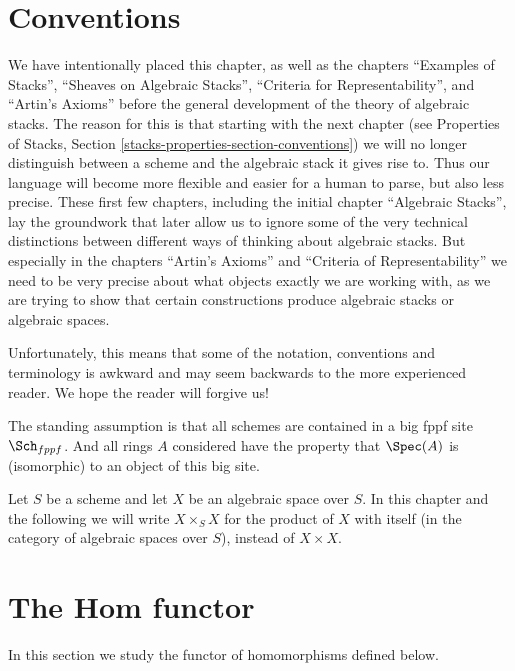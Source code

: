 \section{Conventions}
\label{quot-section-conventions}
We have intentionally placed this chapter, as well as the chapters
``Examples of Stacks'', ``Sheaves on Algebraic Stacks'',
``Criteria for Representability'', and ``Artin's Axioms'' before the
general development of the theory of algebraic stacks. The reason
for this is that starting with the next chapter (see
Properties of Stacks, Section \ref{stacks-properties-section-conventions})
we will no longer distinguish between a scheme and the algebraic stack
it gives rise to. Thus our language will become more flexible and
easier for a human to parse, but also less precise. These first few
chapters, including the initial chapter ``Algebraic Stacks'', lay the
groundwork that later allow us to ignore some of the very technical
distinctions between different ways of thinking about algebraic stacks.
But especially in the chapters ``Artin's Axioms'' and
``Criteria of Representability'' we need
to be very precise about what objects exactly we are working with, as
we are trying to show that certain constructions produce algebraic stacks or
algebraic spaces.

\medskip\noindent
Unfortunately, this means that some of the notation, conventions and
terminology is awkward and may seem backwards to the more experienced
reader. We hope the reader will forgive us!

\medskip\noindent
The standing assumption is that all schemes are contained in
a big fppf site $\Sch_{fppf}$. And all rings $A$ considered
have the property that $\Spec(A)$ is (isomorphic) to an
object of this big site.

\medskip\noindent
Let $S$ be a scheme and let $X$ be an algebraic space over $S$.
In this chapter and the following we will write $X \times_S X$
for the product of $X$ with itself (in the category of algebraic
spaces over $S$), instead of $X \times X$.

\section{The Hom functor}
\label{quot-section-hom}
In this section we study the functor of homomorphisms defined below.

